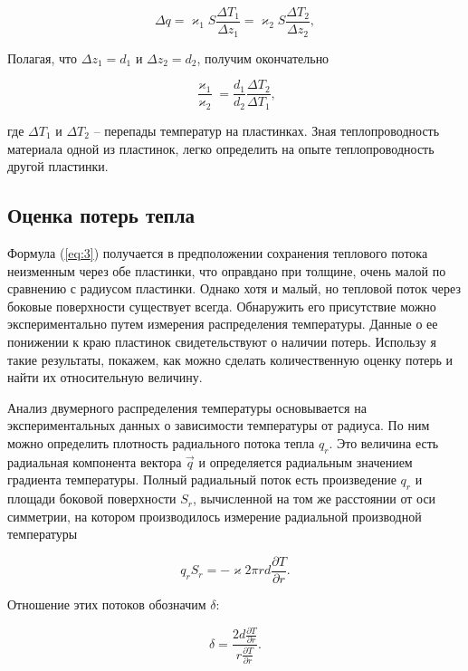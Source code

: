 \documentclass[a4paper,11.5pt]{article} %
\begin{document}
\begin{equation}
	\Delta q =  \varkappa_1 S \frac{\Delta T_1}{\Delta z_1} =  \varkappa_2 S \frac{\Delta T_2}{\Delta z_2},
	\label{eq:2}
\end{equation}

Полагая, что $\Delta z_1 = d_1$ и $\Delta z_2 = d_2$, получим окончательно 

\begin{equation}
	\frac{\varkappa_1}{\varkappa_2} = \frac{d_1}{d_2}\frac{\Delta T_2}{\Delta T_1},
	\label{eq:3}
\end{equation} 

где $\Delta T_1$ и $\Delta T_2$ -- перепады температур на пластинках. Зная теплопроводность материала одной из пластинок, легко определить на опыте
теплопроводность другой пластинки.

\subsection{Оценка потерь тепла}
Формула (\ref{eq:3}) получается в предположении сохранения теплового потока неизменным через обе пластинки, что оправдано при толщине, очень малой по сравнению с радиусом пластинки. Однако хотя и малый, но тепловой поток через боковые поверхности существует всегда. Обнаружить его присутствие можно экспериментально путем измерения распределения температуры. Данные о ее понижении к краю пластинок свидетельствуют о наличии потерь. Использу я такие результаты, покажем, как можно сделать количественную оценку потерь
и найти их относительную величину.

Анализ двумерного распределения температуры основывается на экспериментальных данных о зависимости температуры от радиуса. По ним можно определить плотность радиального потока тепла $q_r$. Это величина есть радиальная компонента вектора $\vec{q}$ и определяется радиальным значением градиента температуры. Полный радиальный поток есть произведение $q_r$ и
площади боковой поверхности $S_r$, вычисленной на том же расстоянии
от оси симметрии, на котором производилось измерение радиальной
производной температуры

\begin{equation}
	q_rS_r=-\varkappa 2 \pi r d \frac{\partial T}{\partial r}.
	\label{eq:4}
\end{equation}

Отношение этих потоков обозначим $\delta$:

\begin{equation}
	\delta = \frac{2d\frac{\partial T}{\partial r}}{r \frac{\partial T}{\partial r}}.
	\label{eq:5}
\end{equation}
\end{document}
